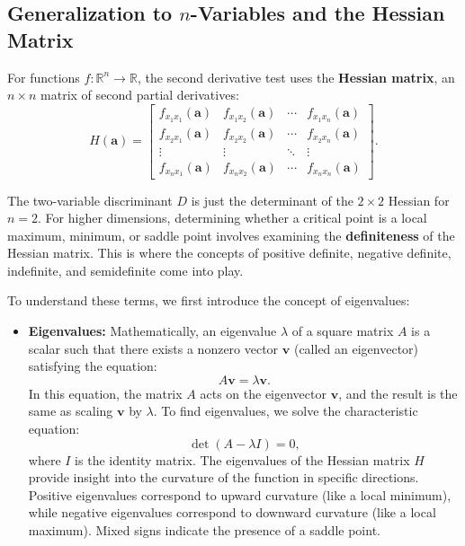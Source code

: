 \subsection*{Generalization to \( n \)-Variables and the Hessian Matrix}  

\noindent For functions \( f: \mathbb{R}^n \to \mathbb{R} \), the second derivative test uses the \textbf{Hessian matrix}, an \( n \times n \) matrix of second partial derivatives:
\[
H(\mathbf{a}) = \begin{bmatrix}
f_{x_1x_1}(\mathbf{a}) & f_{x_1x_2}(\mathbf{a}) & \cdots & f_{x_1x_n}(\mathbf{a}) \\[5pt]
f_{x_2x_1}(\mathbf{a}) & f_{x_2x_2}(\mathbf{a}) & \cdots & f_{x_2x_n}(\mathbf{a}) \\[5pt]
\vdots & \vdots & \ddots & \vdots \\[5pt]
f_{x_nx_1}(\mathbf{a}) & f_{x_nx_2}(\mathbf{a}) & \cdots & f_{x_nx_n}(\mathbf{a})
\end{bmatrix}.
\]

\noindent The two-variable discriminant \( D \) is just the determinant of the \( 2 \times 2 \) Hessian for \( n=2 \). For higher dimensions, determining whether a critical point is a local maximum, minimum, or saddle point involves examining the \textbf{definiteness} of the Hessian matrix. This is where the concepts of positive definite, negative definite, indefinite, and semidefinite come into play.

\noindent To understand these terms, we first introduce the concept of eigenvalues:

\begin{itemize}
  \item \textbf{Eigenvalues:} Mathematically, an eigenvalue \( \lambda \) of a square matrix \( A \) is a scalar such that there exists a nonzero vector \( \mathbf{v} \) (called an eigenvector) satisfying the equation:
  \[
  A \mathbf{v} = \lambda \mathbf{v}.
  \]
  In this equation, the matrix \( A \) acts on the eigenvector \( \mathbf{v} \), and the result is the same as scaling \( \mathbf{v} \) by \( \lambda \). To find eigenvalues, we solve the characteristic equation:
  \[
  \det(A - \lambda I) = 0,
  \]
  where \( I \) is the identity matrix. The eigenvalues of the Hessian matrix \( H \) provide insight into the curvature of the function in specific directions. Positive eigenvalues correspond to upward curvature (like a local minimum), while negative eigenvalues correspond to downward curvature (like a local maximum). Mixed signs indicate the presence of a saddle point.
\end{itemize}

